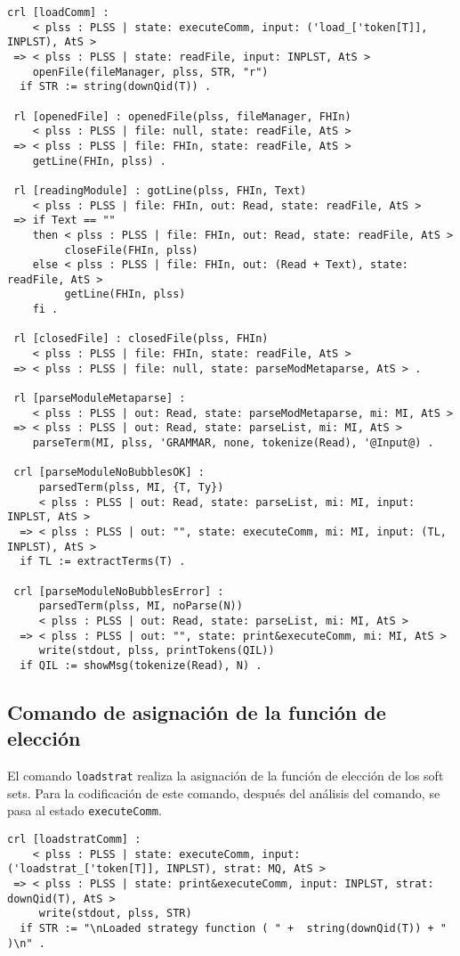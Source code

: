 \begin{lstlisting}[language=Maude,label={lst:load},caption={Comando \texttt{load} en PLSS.}]
 crl [loadComm] :
    < plss : PLSS | state: executeComm, input: ('load_['token[T]], INPLST), AtS >
 => < plss : PLSS | state: readFile, input: INPLST, AtS >
    openFile(fileManager, plss, STR, "r")
  if STR := string(downQid(T)) .

 rl [openedFile] : openedFile(plss, fileManager, FHIn)
    < plss : PLSS | file: null, state: readFile, AtS >
 => < plss : PLSS | file: FHIn, state: readFile, AtS >
    getLine(FHIn, plss) .

 rl [readingModule] : gotLine(plss, FHIn, Text)
    < plss : PLSS | file: FHIn, out: Read, state: readFile, AtS >
 => if Text == ""
    then < plss : PLSS | file: FHIn, out: Read, state: readFile, AtS >
         closeFile(FHIn, plss)
    else < plss : PLSS | file: FHIn, out: (Read + Text), state: readFile, AtS >
         getLine(FHIn, plss)
    fi .

 rl [closedFile] : closedFile(plss, FHIn)
    < plss : PLSS | file: FHIn, state: readFile, AtS >
 => < plss : PLSS | file: null, state: parseModMetaparse, AtS > .

 rl [parseModuleMetaparse] :
    < plss : PLSS | out: Read, state: parseModMetaparse, mi: MI, AtS >
 => < plss : PLSS | out: Read, state: parseList, mi: MI, AtS >
    parseTerm(MI, plss, 'GRAMMAR, none, tokenize(Read), '@Input@) .

 crl [parseModuleNoBubblesOK] :
     parsedTerm(plss, MI, {T, Ty})
     < plss : PLSS | out: Read, state: parseList, mi: MI, input: INPLST, AtS >
  => < plss : PLSS | out: "", state: executeComm, mi: MI, input: (TL, INPLST), AtS >
  if TL := extractTerms(T) .

 crl [parseModuleNoBubblesError] :
     parsedTerm(plss, MI, noParse(N))
     < plss : PLSS | out: Read, state: parseList, mi: MI, AtS >
  => < plss : PLSS | out: "", state: print&executeComm, mi: MI, AtS >
     write(stdout, plss, printTokens(QIL))
  if QIL := showMsg(tokenize(Read), N) .
\end{lstlisting}
\smallskip


\subsection{Comando de asignación de la función de elección}

El comando \texttt{loadstrat} realiza la asignación de la función de elección de los soft sets.
%
Para la codificación de este comando, después del análisis del comando, se pasa al estado \texttt{executeComm}.
\begin{lstlisting}[language=Maude]
 crl [loadstratComm] :
    < plss : PLSS | state: executeComm, input: ('loadstrat_['token[T]], INPLST), strat: MQ, AtS >
 => < plss : PLSS | state: print&executeComm, input: INPLST, strat: downQid(T), AtS >
     write(stdout, plss, STR)
  if STR := "\nLoaded strategy function ( " +  string(downQid(T)) + " )\n" .
\end{lstlisting}
\smallskip

